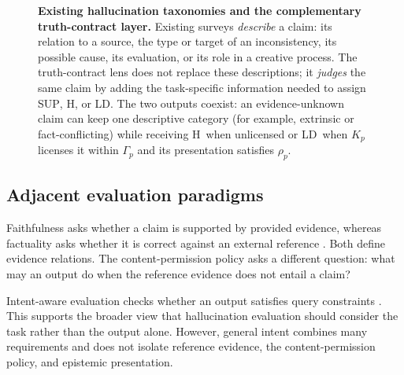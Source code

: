 \documentclass{clv2025}
\newcommand{\LD}{\textsc{LD}}
\newcommand{\Hall}{\textsc{H}}
\newcommand{\SUP}{\textsc{SUP}}
\begin{document}
\begin{figure}[t]
{}
\caption{\textbf{Existing hallucination taxonomies and the complementary truth-contract layer.}
Existing surveys \emph{describe} a claim: its relation to a source, the type or target of an inconsistency, its possible cause, its evaluation, or its role in a creative process.
The truth-contract lens does not replace these descriptions; it \emph{judges} the same claim by adding the task-specific information needed to assign \SUP, \Hall, or \LD.
The two outputs coexist: an evidence-unknown claim can keep one descriptive category (for example, extrinsic or fact-conflicting) while receiving \Hall\ when unlicensed or \LD\ when $K_p$ licenses it within $\Gamma_p$ and its presentation satisfies $\rho_p$.}
\label{fig:survey-contract}
\end{figure}

\subsection{Adjacent evaluation paradigms}

Faithfulness asks whether a claim is supported by provided evidence, whereas factuality asks whether it is correct against an external reference \citep{maynez_faithfulness_2020,kryscinski_evaluating_2020}.
Both define evidence relations.
The content-permission policy asks a different question: what may an output do when the reference evidence does not entail a claim?

Intent-aware evaluation checks whether an output satisfies query constraints \citep{hao_faithqa_2025}.
This supports the broader view that hallucination evaluation should consider the task rather than the output alone.
However, general intent combines many requirements and does not isolate reference evidence, the content-permission policy, and epistemic presentation.
\end{document}

